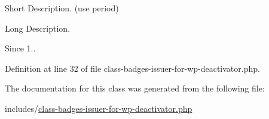 Short Description. (use period)

Long Description.

\begin{DoxySince}{Since}
1.. 
\end{DoxySince}


Definition at line 32 of file class-\/badges-\/issuer-\/for-\/wp-\/deactivator.\+php.



The documentation for this class was generated from the following file\+:\begin{DoxyCompactItemize}
\item 
includes/\hyperlink{class-badges-issuer-for-wp-deactivator_8php}{class-\/badges-\/issuer-\/for-\/wp-\/deactivator.\+php}\end{DoxyCompactItemize}
